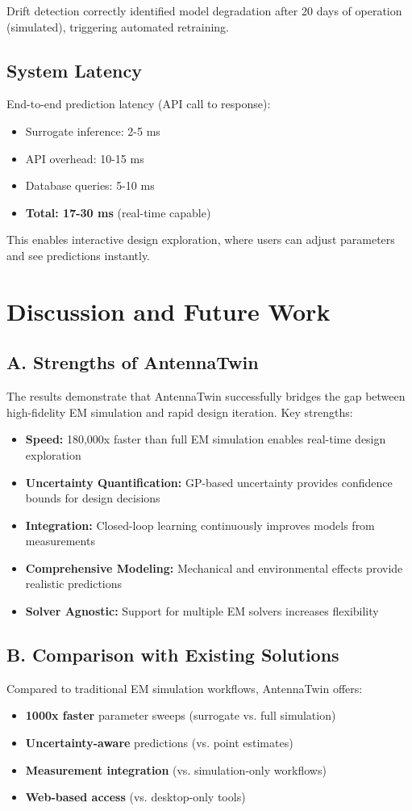 \documentclass[conference]{IEEEtran}
\begin{document}
Drift detection correctly identified model degradation after 20 days of operation (simulated), triggering automated retraining.

\subsection{System Latency}
End-to-end prediction latency (API call to response):
\begin{itemize}
    \item Surrogate inference: 2-5 ms
    \item API overhead: 10-15 ms
    \item Database queries: 5-10 ms
    \item \textbf{Total: 17-30 ms} (real-time capable)
\end{itemize}

This enables interactive design exploration, where users can adjust parameters and see predictions instantly.

\section{Discussion and Future Work}

\subsection*{A. Strengths of AntennaTwin}
The results demonstrate that AntennaTwin successfully bridges the gap between high-fidelity EM simulation and rapid design iteration. Key strengths:
\begin{itemize}
    \item \textbf{Speed:} 180,000x faster than full EM simulation enables real-time design exploration
    \item \textbf{Uncertainty Quantification:} GP-based uncertainty provides confidence bounds for design decisions
    \item \textbf{Integration:} Closed-loop learning continuously improves models from measurements
    \item \textbf{Comprehensive Modeling:} Mechanical and environmental effects provide realistic predictions
    \item \textbf{Solver Agnostic:} Support for multiple EM solvers increases flexibility
\end{itemize}

\subsection*{B. Comparison with Existing Solutions}
Compared to traditional EM simulation workflows, AntennaTwin offers:
\begin{itemize}
    \item \textbf{1000x faster} parameter sweeps (surrogate vs. full simulation)
    \item \textbf{Uncertainty-aware} predictions (vs. point estimates)
    \item \textbf{Measurement integration} (vs. simulation-only workflows)
    \item \textbf{Web-based access} (vs. desktop-only tools)
\end{itemize}
\end{document}
